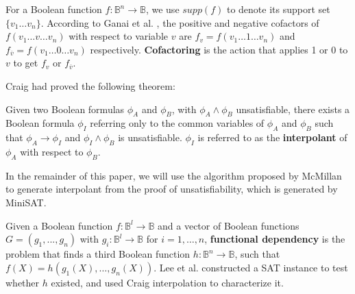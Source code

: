 \documentclass[journal]{IEEEtran}
\begin{document}

For a Boolean function $f:\mathbb{B}^n\to \mathbb{B}$,
we use $supp(f)$ to denote its support set $\{v_1\dots v_n\}$.
According to Ganai et al. \cite{Cofact},
the positive and negative cofactors of $f(v_1\dots v\dots v_n)$ with respect to variable
$v$ are $f_v=f(v_1\dots 1\dots v_n)$ and $f_{\overline{v}}=f(v_1\dots 0\dots v_n)$
respectively.
\textbf{Cofactoring} is the action that applies 1 or 0 to $v$ to get $f_v$ or $f_{\overline{v}}$.


Craig\cite{Craig} had proved the following theorem:

\begin{theorem}\label{thm_craig}
Given two Boolean formulas $\phi_A$ and $\phi_B$,
with $\phi_A\wedge \phi_B$ unsatisfiable,
there exists a Boolean formula $\phi_I$ referring only
to the common variables of $\phi_A$ and $\phi_B$ such that $\phi_A\to \phi_I$
and $\phi_I\wedge \phi_B$ is unsatisfiable.
$\phi_I$ is referred to as the \textbf{interpolant} of $\phi_A$ with respect to $\phi_B$.
\end{theorem}

In the remainder of this paper,
we will use the algorithm proposed by McMillan\cite{interp_McMillan} to generate interpolant from the proof of unsatisfiability,
which is generated by MiniSAT\cite{EXTSAT}.

Given a Boolean function $f:\mathbb{B}^l\to \mathbb{B}$ and a vector of
Boolean functions $G=(g_1, ..., g_n)$ with $g_i: \mathbb{B}^l\to \mathbb{B}$ for $i =1,\dots ,n$,
\textbf{functional dependency} \cite{funcdep} is the problem that
finds a third Boolean function $h:\mathbb{B}^n\to \mathbb{B}$,
such that $f(X) = h(g_1(X),\dots , g_n(X))$.
Lee et al. \cite{funcdep} constructed a SAT instance to test whether $h$ existed,
and used Craig interpolation \cite{interp_McMillan} to characterize it.

\end{document}
